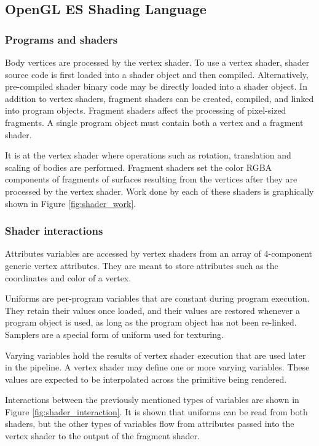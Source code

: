 \documentclass[conference]{IEEEtran}
\begin{document}
	\subsection{OpenGL ES Shading Language}

		\subsubsection{Programs and shaders}
Body vertices are processed by the vertex shader. To use a vertex shader, shader source code is first loaded into a shader object and then compiled. Alternatively, pre-compiled shader binary code may be directly loaded into a shader object. In addition to vertex shaders, fragment shaders can be created, compiled, and linked into program objects. Fragment shaders affect the processing of pixel-sized fragments. A single program object must contain both a vertex and a fragment shader.

It is at the vertex shader where operations such as rotation, translation and scaling of bodies are performed. Fragment shaders set the color RGBA components of fragments of surfaces resulting from the vertices after they are processed by the vertex shader. Work done by each of these shaders is graphically shown in Figure \ref{fig:shader_work}.



		\subsubsection{Shader interactions}
Attributes variables are accessed by vertex shaders from an array of 4-component generic vertex attributes. They are meant to store attributes such as the coordinates and color of a vertex.

Uniforms are per-program variables that are constant during program execution. They retain their values once loaded, and their values are restored whenever a program object is used, as long as the program object has not been re-linked. Samplers are a special form of uniform used for texturing.

Varying variables hold the results of vertex shader execution that are used later in the pipeline. A vertex shader may define one or more varying variables. These values are expected to be interpolated across the primitive being rendered.

Interactions between the previously mentioned types of variables are shown in Figure \ref{fig:shader_interaction}. It is shown that uniforms can be read from both shaders, but the other types of variables flow from attributes passed into the vertex shader to the output of the fragment shader.
\end{document}

